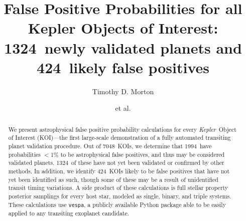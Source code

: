 \documentclass{emulateapj}
\newcommand{\ncalc}{7048}
\newcommand{\nval}{1994} %
\newcommand{\nvalnew}{1324} %
\newcommand{\nfpnew}{424}  %
\newcommand{\kepler}{\textit{Kepler}}
\newcommand{\vespa}{\texttt{vespa}}
\begin{document}

\title{False Positive Probabilities for all Kepler Objects of Interest: \\
        \nvalnew\ newly validated planets and \nfpnew\ likely false positives}


\author{Timothy D. Morton}
\author{et al.}



\begin{abstract}
We present astrophysical false positive probability calculations for
every \kepler\ Object of Interest (KOI)---the first large-scale
demonstration of a fully automated transiting planet validation
procedure.  Out of \ncalc\ KOIs, we determine that \nval\ have
probabilities $<$1\% to be astrophysical false positives, and thus may
be considered validated planets.  \nvalnew\ of these have not yet been
validated or confirmed by other methods.  In addition, we identify
\nfpnew\ KOIs likely to be false positives that have not yet been
identified as such, though some of these may be a result of
unidentified transit timing variations. A side product of these
calculations is full stellar property posterior samplings for every
host star, modeled as single, binary, and triple systems.  These
calculations use \vespa, a publicly available Python package able to
be easily applied to any transiting exoplanet candidate.
\end{abstract}

\end{document}
